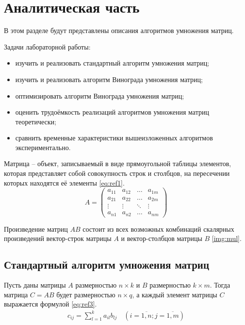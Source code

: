 \chapter{Аналитическая часть}

В этом разделе будут представлены описания алгоритмов умножения матриц.

Задачи лабораторной работы:
\begin{itemize}
	\item изучить и реализовать стандартный алгоритм умножения матриц;
	\item изучить и реализовать алгоритм Винограда умножения матриц;
	\item оптимизировать алгоритм Винограда умножения матриц;
	\item оценить трудоёмкость реализаций алгоритмов умножения матриц теоретически;
	\item сравнить временные характеристики вышеизложенных алгоритмов экспериментально.
\end{itemize}

Матрица -- объект, записываемый в виде прямоугольной таблицы элементов, которая представляет собой совокупность строк и столбцов, на пересечении которых находятся её элементы \ref{eq:ref1}.
\begin{equation}
	A = \left(
	\begin{array}{cccc}
			a_{11} & a_{12} & \ldots & a_{1m} \\
			a_{21} & a_{22} & \ldots & a_{2m} \\
			\vdots & \vdots & \ddots & \vdots \\
			a_{n1} & a_{n2} & \ldots & a_{nm}
		\end{array}
	\right)
	\label{eq:ref1}
\end{equation}

Произведение матриц $AB$ состоит из всех возможных комбинаций скалярных произведений вектор-строк матрицы $A$ и вектор-столбцов матрицы $B$ \ref{img:mul}.


\section{Стандартный алгоритм умножения матриц}

Пусть даны матрицы $A$ размерностью $n \times k$ и $B$ размерностью $k \times m$.
Тогда матрица $C = AB$ будет размерностью $n \times q$, а каждый элемент матрицы $C$ выражается формулой \ref{eq:ref3}.
\begin{equation}
	\begin{array}{cc}
		c_{ij} = \sum\limits_{l=1}^k a_{il}b_{lj} \quad (i=\overline{1,n}; j=\overline{1,m})
	\end{array}
	\label{eq:ref3}
\end{equation}

